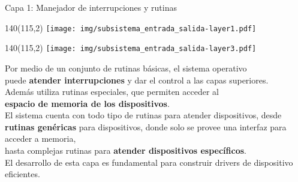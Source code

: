 \documentclass[aspectratio=169]{beamer}
\begin{document}
\begin{frame}{Capa 1: Manejador de interrupciones y rutinas}
    \begin{textblock}{140}(115,2) \texttt{[image: img/subsistema\_entrada\_salida-layer1.pdf]} \end{textblock}
    \begin{textblock}{140}(115,2) \texttt{[image: img/subsistema\_entrada\_salida-layer3.pdf]} \end{textblock}
    Por medio de un conjunto de rutinas básicas, el sistema operativo\\
    puede \textbf{atender interrupciones} y dar el control a las capas superiores.\\
    \bigskip
    Además utiliza rutinas especiales, que permiten acceder al\\ \textbf{espacio de memoria de los dispositivos}.\\
    \bigskip
    \pause
    El sistema cuenta con todo tipo de rutinas para atender dispositivos, desde\\
    \textbf{rutinas genéricas} para dispositivos, donde solo se provee una interfaz para acceder a memoria,\\
    hasta complejas rutinas para \textbf{atender dispositivos específicos}.\\
    \bigskip
    \textcolor{naranjauca}{El desarrollo de esta capa es fundamental para construir drivers de dispositivo eficientes.}
\end{frame}
\end{document}
